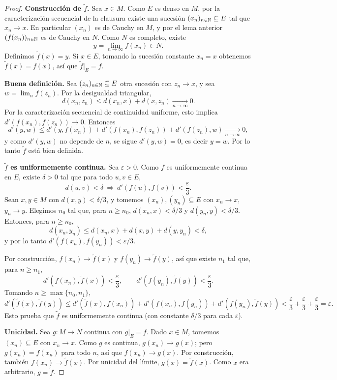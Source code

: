 \begin{proof}
\textbf{Construcción de $\tilde f$.} Sea $x \in M$. Como $E$ es denso en
$M$, por la caracterización secuencial de la clausura existe una sucesión
$(x_n)_{n\in\mathbb{N}} \subseteq E$ tal que $x_n \to x$. En particular $(x_n)$ es
de Cauchy en $M$, y por el lema anterior $(f(x_n))_{n\in\mathbb{N}}$ es de Cauchy
en $N$. Como $N$ es completo, existe
\[
y = \lim_{n\to\infty} f(x_n) \in N.
\]
Definimos $\tilde f(x) = y$. Si $x \in E$, tomando la sucesión constante
$x_n=x$ obtenemos $\tilde f(x)=f(x)$, así que $\tilde f|_E = f$.

\medskip

\textbf{Buena definición.} Sea $(z_n)_{n\in\mathbb{N}} \subseteq E$ otra sucesión
con $z_n \to x$, y sea $w = \lim_n f(z_n)$. Por la desigualdad triangular,
\[
d(x_n,z_n) \le d(x_n,x) + d(x,z_n) \xrightarrow[n\to\infty]{} 0.
\]
Por la caracterización secuencial de continuidad uniforme, esto implica
$d'(f(x_n),f(z_n)) \to 0$. Entonces
\[
d'(y,w) \le d'(y,f(x_n)) + d'(f(x_n),f(z_n)) + d'(f(z_n),w)
\xrightarrow[n\to\infty]{} 0,
\]
y como $d'(y,w)$ no depende de $n$, se sigue $d'(y,w)=0$, es decir $y=w$.
Por lo tanto $\tilde f$ está bien definida.

\medskip

\textbf{$\tilde f$ es uniformemente continua.} Sea $\varepsilon>0$. Como
$f$ es uniformemente continua en $E$, existe $\delta>0$ tal que para todo
$u,v\in E$,
\[
d(u,v) < \delta \ \Rightarrow\ d'(f(u),f(v)) < \frac{\varepsilon}{3}.
\]
Sean $x,y \in M$ con $d(x,y) < \delta/3$, y tomemos $(x_n),(y_n)
\subseteq E$ con $x_n \to x$, $y_n \to y$. Elegimos $n_0$ tal que, para
$n\ge n_0$, $d(x_n,x)<\delta/3$ y $d(y_n,y)<\delta/3$. Entonces, para
$n\ge n_0$,
\[
d(x_n,y_n) \le d(x_n,x)+d(x,y)+d(y,y_n) < \delta,
\]
y por lo tanto $d'(f(x_n),f(y_n)) < \varepsilon/3$.

Por construcción, $f(x_n) \to \tilde f(x)$ y $f(y_n) \to \tilde f(y)$, así
que existe $n_1$ tal que, para $n\ge n_1$,
\[
d'(f(x_n),\tilde f(x)) < \frac{\varepsilon}{3}, \qquad
d'(f(y_n),\tilde f(y)) < \frac{\varepsilon}{3}.
\]
Tomando $n \ge \max\{n_0,n_1\}$,
\[
d'(\tilde f(x),\tilde f(y)) \le d'(\tilde f(x),f(x_n)) +
d'(f(x_n),f(y_n)) + d'(f(y_n),\tilde f(y))
< \frac{\varepsilon}{3}+\frac{\varepsilon}{3}+\frac{\varepsilon}{3}
= \varepsilon.
\]
Esto prueba que $\tilde f$ es uniformemente continua (con constante
$\delta/3$ para cada $\varepsilon$).

\medskip

\textbf{Unicidad.} Sea $g : M \to N$ continua con $g|_E = f$. Dado $x\in
M$, tomemos $(x_n)\subseteq E$ con $x_n \to x$. Como $g$ es continua,
$g(x_n) \to g(x)$; pero $g(x_n)=f(x_n)$ para todo $n$, así que $f(x_n)
\to g(x)$. Por construcción, también $f(x_n) \to \tilde f(x)$. Por
unicidad del límite, $g(x) = \tilde f(x)$. Como $x$ era arbitrario, $g =
\tilde f$.
\end{proof}